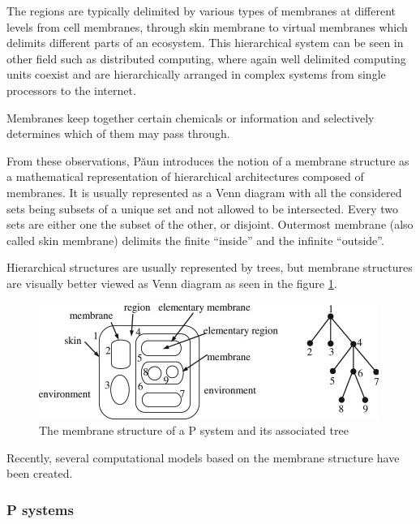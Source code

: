 The regions are typically delimited by various types of membranes at different levels from cell membranes, through skin membrane to virtual membranes which delimits different parts of an ecosystem.
This hierarchical system can be seen in other field such as distributed computing, where again well delimited computing units coexist and are hierarchically arranged in complex systems from single processors to the internet.

Membranes keep together certain chemicals or information and selectively determines which of them may pass through.


From these observations, P\u{a}un \cite{Paun98} introduces the notion of a membrane structure as a mathematical representation of hierarchical architectures composed of membranes. It is usually represented as a Venn diagram with all the considered sets being subsets of a unique set and not allowed to be intersected. Every two sets are either one the subset of the other, or disjoint. Outermost membrane (also called skin membrane) delimits the finite ``inside'' and the infinite ``outside''.

Hierarchical structures are usually represented by trees, but membrane structures are visually better viewed as Venn diagram as seen in the figure \ref{fig:membrane_structure}.

\begin{figure}
  \centering
  \includegraphics{img/membrane_structure.jpg}
  \caption{The membrane structure of a P system and its associated tree \cite{Zhang20101997AnalyzingRadarSignalsWithMembrane}}
  \label{fig:membrane_structure}
\end{figure}


Recently, several computational models based on the membrane structure have been created.




\subsubsection{P systems} %
\label{subs:p_systems}

